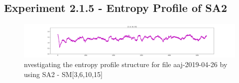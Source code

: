 \subsection{Experiment 2.1.5 - Entropy Profile of SA2}
    \begin{figure}[h]
    \begin{center}
    	\includegraphics[scale=0.2]{src/main-matter/results/experiment-age/entropy/window100/[3,6,10,15]}
    \caption{nvestigating the entropy profile structure for file aaj-2019-04-26 by using SA2 - SM[3,6,10,15]}
    \label{default}
    \end{center}
    \end{figure}
%
%




